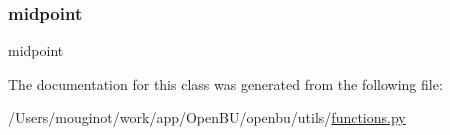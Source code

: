\subsubsection{\texorpdfstring{midpoint}{midpoint}}
{\footnotesize\ttfamily midpoint}



The documentation for this class was generated from the following file\+:\begin{DoxyCompactItemize}
\item 
/\+Users/mouginot/work/app/\+Open\+B\+U/openbu/utils/\mbox{\hyperlink{utils_2functions_8py}{functions.\+py}}\end{DoxyCompactItemize}
